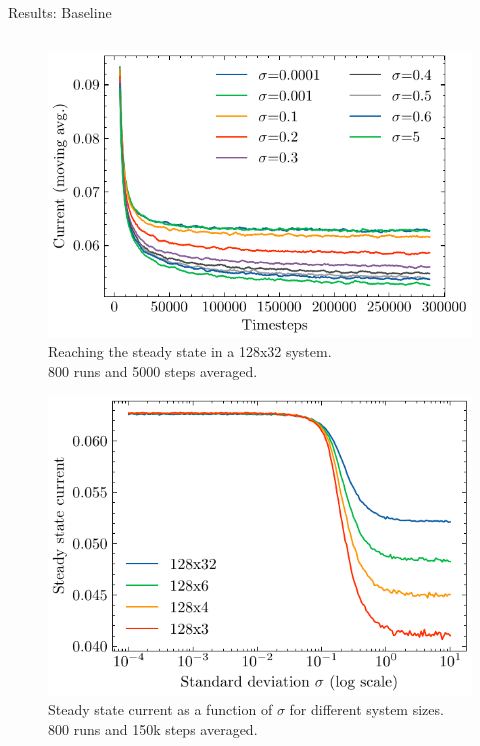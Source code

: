 \documentclass[10pt,xcolor=table, aspectratio=1610]{beamer}
\begin{document}
\begin{frame}{Results: Baseline}
\begin{columns}
\begin{overprint}
\begin{figure}
      \includegraphics[width=\textwidth]{../Thesis/img/results/currents_fixed_sigma_128x32.pdf}
      \caption*{Reaching the steady state in a 128x32 system. \\ 800 runs and 5000 steps averaged.}
    \end{figure}
    \begin{figure}
      \includegraphics[width=\textwidth]{../Thesis/img/results/steady_state_current_sizes_log.pdf}
      \caption*{Steady state current as a function of $\sigma$ for different system sizes.\\800 runs and 150k steps averaged.}
    \end{figure}
    \end{overprint}
  \end{columns}
\end{frame}
\end{document}
